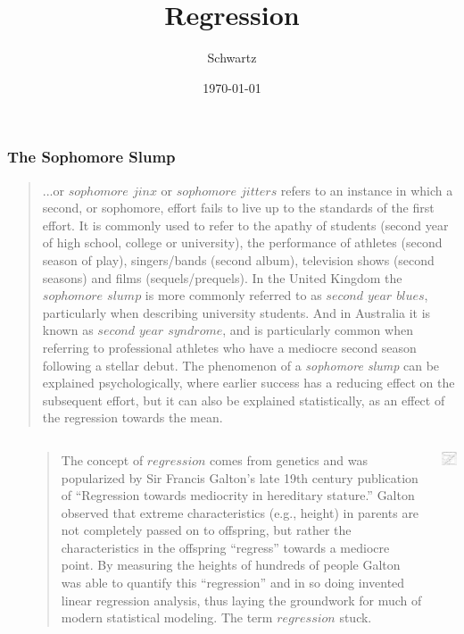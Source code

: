 \documentclass[xcolor={dvipsnames}]{beamer}
\title{Regression}
\author{Schwartz}
\date{\today}
\begin{document}
\frame{\titlepage}




\frame
{
 \frametitle{The Sophomore Slump}

{
\selectfont
\begin{quote}
\tiny
\justify

...or \emph{$sophomore$ $jinx$} or \emph{$sophomore$ $jitters$} refers to an instance in which a second, or sophomore, effort fails to live up to the standards of the first effort. It is commonly used to refer to the apathy of students (second year of high school, college or university), the performance of athletes (second season of play), singers/bands (second album), television shows (second seasons) and films (sequels/prequels). In the United Kingdom the \emph{$sophomore$ $slump$} is more commonly referred to as \emph{$second$ $year$ $blues$}, particularly when describing university students. And in Australia it is known as \emph{$second$ $year$ $syndrome$}, and is particularly common when referring to professional athletes who have a mediocre second season following a stellar debut. The phenomenon of a \emph{sophomore slump} can be explained psychologically, where earlier success has a reducing effect on the subsequent effort, but it can also be explained statistically, as an effect of the regression towards the mean.

\end{quote}
}

\begin{columns}
\begin{column}{.011\textwidth}
\end{column}
\begin{column}{.6\textwidth}
{
\selectfont
\begin{quote}
\tiny
\justify

The concept of $regression$ comes from genetics and was popularized by Sir Francis Galton's late 19th century publication of ``Regression towards mediocrity in hereditary stature.'' Galton observed that extreme characteristics (e.g., height) in parents are not completely passed on to offspring, but rather the characteristics in the offspring ``regress'' towards a mediocre point. By measuring the heights of hundreds of people Galton was able to quantify this ``regression'' and in so doing invented linear regression analysis, thus laying the groundwork for much of modern statistical modeling. The term $regression$ stuck.
\end{quote}
}
\end{column}
\begin{column}{.4\textwidth}
\vspace{.1in}
\hspace*{-.39in}\includegraphics[width=1.55in]{stuff/galton.jpg} 


\end{column}
\end{columns}}
\end{document}
